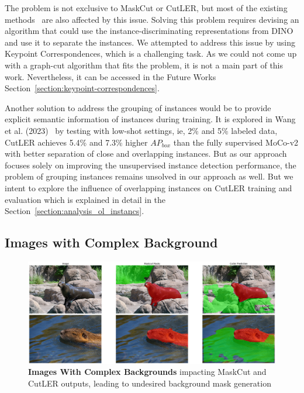 The problem is not exclusive to MaskCut or CutLER, but most of the existing methods~\cite{engstler2023understanding, cond1_support_2, Wang_2022_CVPR} are also affected by this issue. Solving this problem requires devising an algorithm that could use the instance-discriminating representations from DINO and use it to separate the instances. We attempted to address this issue by using Keypoint Correspondences, which is a challenging task. As we could not come up with a graph-cut algorithm that fits the problem, it is not a main part of this work. Nevertheless, it can be accessed in the Future Works Section~\ref{section:keypoint-correspondences}.

Another solution to address the grouping of instances would be to provide explicit semantic information of instances during training. It is explored in Wang et al. (2023)~\cite{wang2023cut} by testing with low-shot settings, ie, 2\% and 5\% labeled data, CutLER achieves 5.4\% and 7.3\% higher \(AP_{box}\) than the fully supervised MoCo-v2 with better separation of close and overlapping instances. But as our approach focuses solely on improving the unsupervised instance detection performance, the problem of grouping instances remains unsolved in our approach as well. But we intent to explore the influence of overlapping instances on CutLER training and evaluation which is explained in detail in the Section~\ref{section:analysis_ol_instancs}.


\subsection{Images with Complex Background}
\label{section:images_with complex_backgrounds}
\begin{figure}
	\centering
	\includegraphics[width=1\textwidth]{Images/main/cutler-prob-noisy-bg.png}
	\caption[\textbf{Cutler's Performance on Images with Complex Background}]{\textbf{Images With Complex Backgrounds} impacting MaskCut and CutLER outputs, leading to undesired background mask generation}
	\label{fig:cutler_noisy_bg_eg}
\end{figure}

